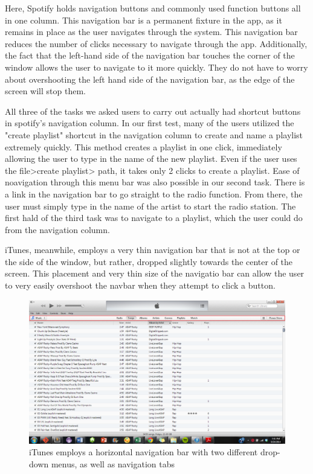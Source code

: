 \documentclass[12pt]{report}
\begin{document}
Here, Spotify holds navigation buttons and commonly used function buttons all in one column. This navigation bar is a permanent fixture in the app, as it remains in place as the user navigates through the system. This navigation bar reduces the number of clicks necessary to navigate through the app. Additionally, the fact that the left-hand side of the navigation bar touches the corner of the window allows the user to navigate to it more quickly. They do not have to worry about overshooting the left hand side of the navigation bar, as the edge of the screen will stop them.

 All three of the tasks we asked users to carry out actually had shortcut buttons in spotify's navigation column. In our first test, many of the users utilized the "create playlist" shortcut in the navigation column to create and name a playlist extremely quickly. This method creates a playlist in one click, immediately allowing the user to type in the name of the new playlist. Even if the user uses the file>create playlist> path, it takes only 2 clicks to create a playlist. Ease of noavigation through this menu bar was also possible in our second task. There is a link in the navigation bar to go straight to the radio function. From there, the user must simply type in the name of the artist to start the radio station. The first hald of the third task was to navigate to a playlist, which the user could do from the navigation column.

iTunes, meanwhile, employs a very thin navigation bar that is not at the top or the side of the window, but rather, dropped slightly towards the center of the screen. This placement and very thin size of the navigatio bar can allow the user to very easily overshoot the navbar when they attempt to click a button. 

\begin{figure}[H]
	\centering
	\includegraphics[width=\textwidth]{chart5.png}
	\caption{iTunes employs a horizontal navigation bar with two different drop-down menus, as well as navigation tabs}
\end{figure}
\end{document}
